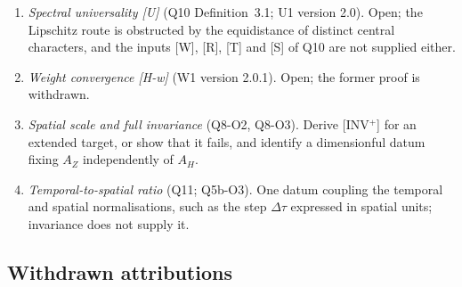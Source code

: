 \documentclass[11pt,a4paper]{article}
\theoremstyle{definition}
\newcommand{\AH}{A_H}
\newcommand{\AZ}{A_Z}
\begin{document}
\begin{enumerate}
        \item \textit{Spectral universality [U]} (Q10 Definition~3.1; U1 version 2.0).
        Open; the Lipschitz route is obstructed by the equidistance of distinct central
        characters, and the inputs [W], [R], [T] and [S] of Q10 are not supplied either.

        \item \textit{Weight convergence [H-w]} (W1 version 2.0.1).
        Open; the former proof is withdrawn.

        \item \textit{Spatial scale and full invariance} (Q8-O2, Q8-O3).
        Derive [INV$^+$] for an extended target, or show that it fails, and identify a
        dimensionful datum fixing $\AZ$ independently of $\AH$.

        \item \textit{Temporal-to-spatial ratio} (Q11; Q5b-O3).
        One datum coupling the temporal and spatial normalisations, such as the step $\Delta\tau$
        expressed in spatial units; invariance does not supply it.
      \end{enumerate}

    \subsection{Withdrawn attributions}
      \label{sec:withdrawn}
\end{document}

